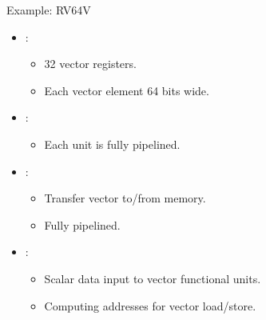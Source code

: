 \begin{frame}[t]{Example: RV64V}
\begin{itemize}
  \item {}: 
    \begin{itemize}
      \item 32 vector registers.
      \item Each vector element 64 bits wide.
    \end{itemize}

  \item {}: 
    \begin{itemize}
      \item Each unit is fully pipelined.
    \end{itemize}

  \item {}: 
    \begin{itemize}
      \item Transfer vector to/from memory.
      \item Fully pipelined.
    \end{itemize}

  \item {}:
    \begin{itemize}
      \item Scalar data input to vector functional units.
      \item Computing addresses for vector load/store.
    \end{itemize}
\end{itemize}
\end{frame}

